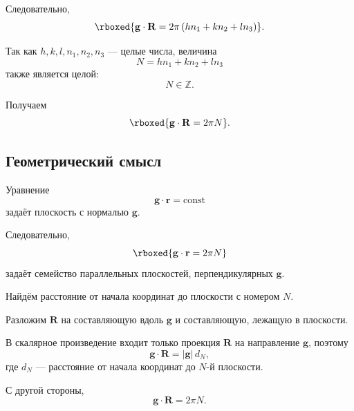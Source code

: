 \documentclass[../final.tex]{subfiles}
\begin{document}
Следовательно,
%
\begin{equation*}
    \rboxed{
        \mathbf g\cdot\mathbf R
        =
        2\pi
        \left(
            hn_1+kn_2+ln_3
        \right)
    }.
\end{equation*}

Так как $h,k,l,n_1,n_2,n_3$ --- целые числа, величина
%
\begin{equation*}
    N
    =
    hn_1+kn_2+ln_3
\end{equation*}
%
также является целой:
%
\begin{equation*}
    N\in\mathbb Z.
\end{equation*}

Получаем
%
\begin{equation*}
    \rboxed{
        \mathbf g\cdot\mathbf R
        =
        2\pi N
    }.
\end{equation*}



\subsection*{Геометрический смысл}

Уравнение
%
\begin{equation*}
    \mathbf g\cdot\mathbf r
    =
    \mathrm{const}
\end{equation*}
%
задаёт плоскость с нормалью $\mathbf g$.

Следовательно,
%
\begin{equation*}
    \rboxed{
        \mathbf g\cdot\mathbf r
        =
        2\pi N
    }
\end{equation*}
%
задаёт семейство параллельных плоскостей,
перпендикулярных $\mathbf g$.

Найдём расстояние от начала координат до плоскости
с номером $N$.

Разложим $\mathbf R$ на составляющую вдоль $\mathbf g$
и составляющую, лежащую в плоскости.

В скалярное произведение входит только проекция
$\mathbf R$ на направление $\mathbf g$, поэтому
%
\begin{equation*}
    \mathbf g\cdot\mathbf R
    =
    |\mathbf g|\,d_N,
\end{equation*}
%
где $d_N$ --- расстояние от начала координат
до $N$-й плоскости.

С другой стороны,
%
\begin{equation*}
    \mathbf g\cdot\mathbf R
    =
    2\pi N.
\end{equation*}
\end{document}
